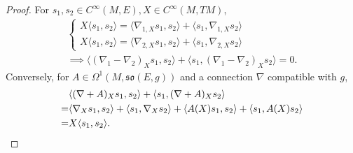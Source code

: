 \begin{proof}
    For $s_1,s_2\in C^\infty(M,E), X\in C^\infty(M,TM)$, 
    \begin{gather*}
        \begin{cases}
            X\langle s_1, s_2 \rangle = \langle \nabla_{1,X} s_1, s_2 \rangle + \langle s_1, \nabla_{1,X} s_2 \rangle \\
            X\langle s_1, s_2 \rangle = \langle \nabla_{2,X} s_1, s_2 \rangle + \langle s_1, \nabla_{2,X} s_2 \rangle
        \end{cases} \\ 
        \implies \langle (\nabla_1 - \nabla_2)_X s_1, s_2 \rangle + \langle s_1, (\nabla_1 - \nabla_2)_X s_2 \rangle = 0.
    \end{gather*}
    Conversely, for $A\in \Omega^1(M,\mathfrak{so}(E,g))$ and a connection $\nabla$ compatible with $g$,
    \begin{align*}
        &\langle (\nabla + A)_X s_1, s_2 \rangle + \langle s_1, (\nabla + A)_X s_2 \rangle \\
        =& \langle \nabla_X s_1, s_2 \rangle + \langle s_1, \nabla_X s_2 \rangle + \langle A(X) s_1, s_2 \rangle + \langle s_1, A(X) s_2 \rangle \\
        =& X\langle s_1, s_2 \rangle. \qedhere
    \end{align*}
\end{proof}
